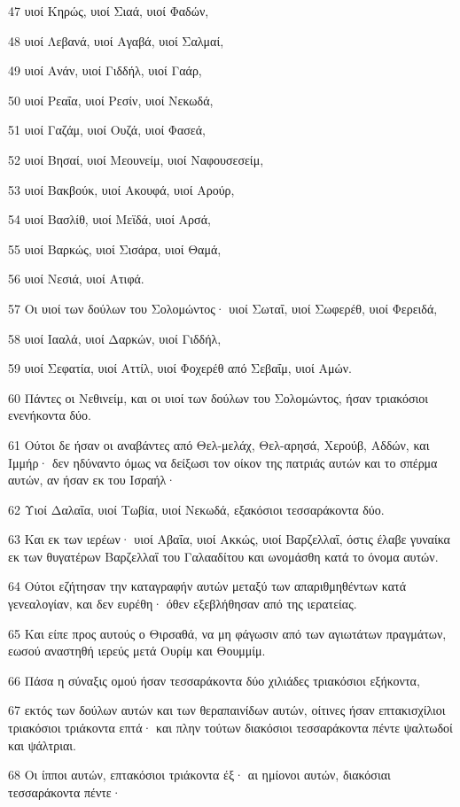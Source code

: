 \par 47 υιοί Κηρώς, υιοί Σιαά, υιοί Φαδών,
\par 48 υιοί Λεβανά, υιοί Αγαβά, υιοί Σαλμαί,
\par 49 υιοί Ανάν, υιοί Γιδδήλ, υιοί Γαάρ,
\par 50 υιοί Ρεαΐα, υιοί Ρεσίν, υιοί Νεκωδά,
\par 51 υιοί Γαζάμ, υιοί Ουζά, υιοί Φασεά,
\par 52 υιοί Βησαί, υιοί Μεουνείμ, υιοί Ναφουσεσείμ,
\par 53 υιοί Βακβούκ, υιοί Ακουφά, υιοί Αρούρ,
\par 54 υιοί Βασλίθ, υιοί Μεϊδά, υιοί Αρσά,
\par 55 υιοί Βαρκώς, υιοί Σισάρα, υιοί Θαμά,
\par 56 υιοί Νεσιά, υιοί Ατιφά.
\par 57 Οι υιοί των δούλων του Σολομώντος· υιοί Σωταΐ, υιοί Σωφερέθ, υιοί Φερειδά,
\par 58 υιοί Ιααλά, υιοί Δαρκών, υιοί Γιδδήλ,
\par 59 υιοί Σεφατία, υιοί Αττίλ, υιοί Φοχερέθ από Σεβαΐμ, υιοί Αμών.
\par 60 Πάντες οι Νεθινείμ, και οι υιοί των δούλων του Σολομώντος, ήσαν τριακόσιοι ενενήκοντα δύο.
\par 61 Ούτοι δε ήσαν οι αναβάντες από Θελ-μελάχ, Θελ-αρησά, Χερούβ, Αδδών, και Ιμμήρ· δεν ηδύναντο όμως να δείξωσι τον οίκον της πατριάς αυτών και το σπέρμα αυτών, αν ήσαν εκ του Ισραήλ·
\par 62 Υιοί Δαλαΐα, υιοί Τωβία, υιοί Νεκωδά, εξακόσιοι τεσσαράκοντα δύο.
\par 63 Και εκ των ιερέων· υιοί Αβαΐα, υιοί Ακκώς, υιοί Βαρζελλαΐ, όστις έλαβε γυναίκα εκ των θυγατέρων Βαρζελλαΐ του Γαλααδίτου και ωνομάσθη κατά το όνομα αυτών.
\par 64 Ούτοι εζήτησαν την καταγραφήν αυτών μεταξύ των απαριθμηθέντων κατά γενεαλογίαν, και δεν ευρέθη· όθεν εξεβλήθησαν από της ιερατείας.
\par 65 Και είπε προς αυτούς ο Θιρσαθά, να μη φάγωσιν από των αγιωτάτων πραγμάτων, εωσού αναστηθή ιερεύς μετά Ουρίμ και Θουμμίμ.
\par 66 Πάσα η σύναξις ομού ήσαν τεσσαράκοντα δύο χιλιάδες τριακόσιοι εξήκοντα,
\par 67 εκτός των δούλων αυτών και των θεραπαινίδων αυτών, οίτινες ήσαν επτακισχίλιοι τριακόσιοι τριάκοντα επτά· και πλην τούτων διακόσιοι τεσσαράκοντα πέντε ψαλτωδοί και ψάλτριαι.
\par 68 Οι ίπποι αυτών, επτακόσιοι τριάκοντα έξ· αι ημίονοι αυτών, διακόσιαι τεσσαράκοντα πέντε·
